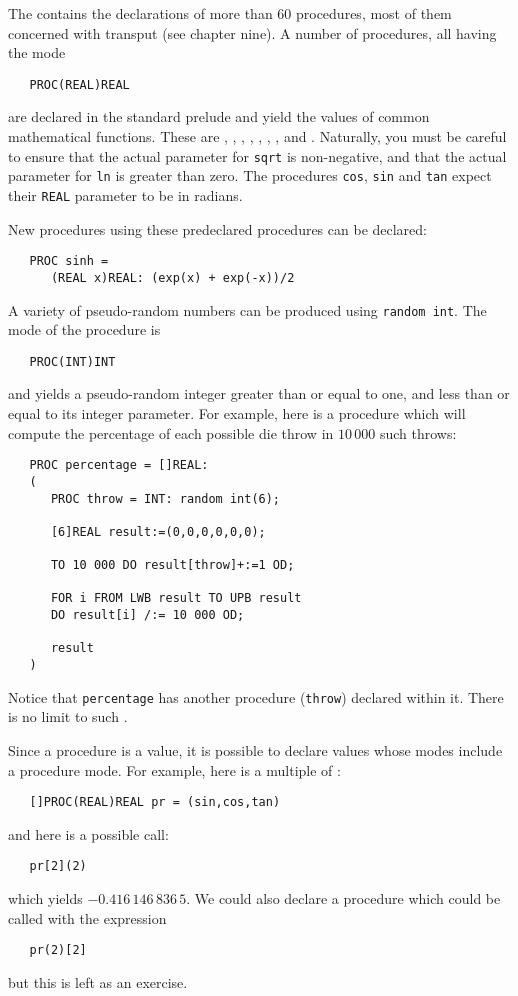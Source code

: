 The  contains the declarations of more than 60
procedures, most of them concerned with transput (see chapter nine).
A number of procedures, all having the mode
\begin{verbatim}
   PROC(REAL)REAL
\end{verbatim}
\noindent
are declared in the standard prelude and yield the values of common
mathematical functions. These are , , ,
, , , ,  and
.  Naturally, you must be careful to ensure that the
actual parameter for \verb|sqrt| is non-negative, and that the actual
parameter for \verb|ln| is greater than zero.  The procedures
\verb|cos|, \verb|sin| and \verb|tan| expect their \verb|REAL|
parameter to be in radians.

New procedures using these predeclared procedures can be declared:
\begin{verbatim}
   PROC sinh =
      (REAL x)REAL: (exp(x) + exp(-x))/2
\end{verbatim}
\noindent
A variety of pseudo-random numbers can be produced using
\verb|random int|. The mode of the procedure  is
\begin{verbatim}
   PROC(INT)INT
\end{verbatim}
\noindent
and yields a pseudo-random integer greater than or equal to one, and
less than or equal to its integer parameter.  For example, here is a
procedure which will compute the percentage of each possible die
throw in $10\,000$ such throws:
\begin{verbatim}
   PROC percentage = []REAL:
   (
      PROC throw = INT: random int(6);

      [6]REAL result:=(0,0,0,0,0,0);

      TO 10 000 DO result[throw]+:=1 OD;

      FOR i FROM LWB result TO UPB result
      DO result[i] /:= 10 000 OD;

      result
   )
\end{verbatim}
\noindent
Notice that \verb|percentage| has another procedure (\verb|throw|)
declared within it. There is no limit to such
.

Since a procedure is a value, it is possible to declare values whose
modes include a procedure mode. For example, here is a
multiple of :
\begin{verbatim}
   []PROC(REAL)REAL pr = (sin,cos,tan)
\end{verbatim}
\noindent
and here is a possible call:
\begin{verbatim}
   pr[2](2)
\end{verbatim}
\noindent
which yields $-0.416\,146\,836\,5$. We could also declare a procedure
which could be called with the expression
\begin{verbatim}
   pr(2)[2]
\end{verbatim}
\noindent
but this is left as an exercise.

